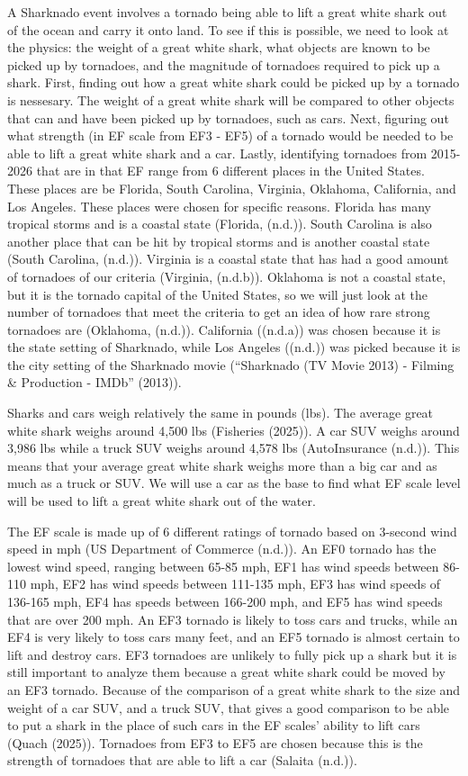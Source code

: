 \documentclass[
  letterpaper,
  DIV=11,
  numbers=noendperiod]{scrreprt}
\begin{document}
A Sharknado event involves a tornado being able to lift a great white
shark out of the ocean and carry it onto land. To see if this is
possible, we need to look at the physics: the weight of a great white
shark, what objects are known to be picked up by tornadoes, and the
magnitude of tornadoes required to pick up a shark. First, finding out
how a great white shark could be picked up by a tornado is nessesary.
The weight of a great white shark will be compared to other objects that
can and have been picked up by tornadoes, such as cars. Next, figuring
out what strength (in EF scale from EF3 - EF5) of a tornado would be
needed to be able to lift a great white shark and a car. Lastly,
identifying tornadoes from 2015-2026 that are in that EF range from 6
different places in the United States. These places are be Florida,
South Carolina, Virginia, Oklahoma, California, and Los Angeles. These
places were chosen for specific reasons. Florida has many tropical
storms and is a coastal state (Florida, (n.d.)). South Carolina is also
another place that can be hit by tropical storms and is another coastal
state (South Carolina, (n.d.)). Virginia is a coastal state that has had
a good amount of tornadoes of our criteria (Virginia, (n.d.b)). Oklahoma
is not a coastal state, but it is the tornado capital of the United
States, so we will just look at the number of tornadoes that meet the
criteria to get an idea of how rare strong tornadoes are (Oklahoma,
(n.d.)). California ((n.d.a)) was chosen because it is the state setting
of Sharknado, while Los Angeles ((n.d.)) was picked because it is the
city setting of the Sharknado movie ({``Sharknado ({TV} Movie 2013) -
Filming \& Production - {IMDb}''} (2013)).

Sharks and cars weigh relatively the same in pounds (lbs). The average
great white shark weighs around 4,500 lbs (Fisheries (2025)). A car SUV
weighs around 3,986 lbs while a truck SUV weighs around 4,578 lbs
(AutoInsurance (n.d.)). This means that your average great white shark
weighs more than a big car and as much as a truck or SUV. We will use a
car as the base to find what EF scale level will be used to lift a great
white shark out of the water.

The EF scale is made up of 6 different ratings of tornado based on
3-second wind speed in mph (US Department of Commerce (n.d.)). An EF0
tornado has the lowest wind speed, ranging between 65-85 mph, EF1 has
wind speeds between 86-110 mph, EF2 has wind speeds between 111-135 mph,
EF3 has wind speeds of 136-165 mph, EF4 has speeds between 166-200 mph,
and EF5 has wind speeds that are over 200 mph. An EF3 tornado is likely
to toss cars and trucks, while an EF4 is very likely to toss cars many
feet, and an EF5 tornado is almost certain to lift and destroy cars. EF3
tornadoes are unlikely to fully pick up a shark but it is still
important to analyze them because a great white shark could be moved by
an EF3 tornado. Because of the comparison of a great white shark to the
size and weight of a car SUV, and a truck SUV, that gives a good
comparison to be able to put a shark in the place of such cars in the EF
scales' ability to lift cars (Quach (2025)). Tornadoes from EF3 to EF5
are chosen because this is the strength of tornadoes that are able to
lift a car (Salaita (n.d.)).
\end{document}
